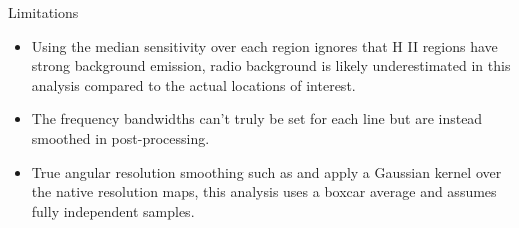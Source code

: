 \documentclass[aspectratio=169]{beamer}
\begin{document}

\begin{frame}{Limitations}{}
  \begin{itemize}
    \item Using the median sensitivity over each region ignores that H II regions have strong background emission, radio background is likely underestimated in this analysis compared to the actual locations of interest.
    \item The frequency bandwidths can't truly be set for each line but are instead smoothed in post-processing.
    \item True angular resolution smoothing such as \cite{andersonGBTDiffuseIonized2021} and \cite{liuSurveyIonizedGas2019} apply a Gaussian kernel over the native resolution maps, this analysis uses a boxcar average and assumes fully independent samples.
  \end{itemize}
\end{frame}
\end{document}
